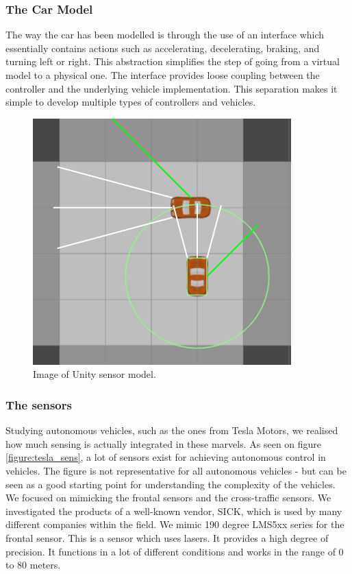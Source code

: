\subsubsection{The Car Model}
The way the car has been modelled is through the use of an interface which essentially contains actions such as accelerating, decelerating, braking, and turning left or right.
This abstraction simplifies the step of going from a virtual model to a physical one.
The interface provides loose coupling between the controller and the underlying vehicle implementation.
This separation makes it simple to develop multiple types of controllers and vehicles.\\

\begin{figure}
\centering
\includegraphics[scale=.5]{img/sensors}
\caption{Image of Unity sensor model.}
\label{figure:unity_sens}
\end{figure}

\subsubsection*{The sensors}
Studying autonomous vehicles, such as the ones from Tesla Motors, we realised how much sensing is actually integrated in these marvels.
As seen on figure \ref{figure:tesla_sens}, a lot of sensors exist for achieving autonomous control in vehicles.
The figure is not representative for all autonomous vehicles - but can be seen as a good starting point for understanding the complexity of the vehicles.\\

We focused on mimicking the frontal sensors and the cross-traffic sensors.
We investigated the products of a well-known vendor, SICK, which is used by many different companies within the field.
We mimic 190 degree LMS5xx series for the frontal sensor. This is a sensor which uses lasers. It provides a high degree of precision. It functions in a lot of different conditions and works in the range of 0 to 80 meters\cite{sick}.\\

